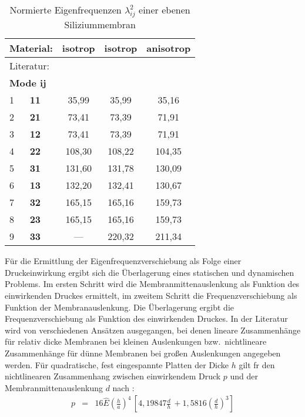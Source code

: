 \begin{table}[htb]
\caption{\label{tabcij}
 Normierte Eigenfrequenzen $\lambda_{ij}^{2}$ einer ebenen Siliziummembran}
\begin{center}
\begin{tabular}{|l||c|c|c|} \hline
 {\bf Material}: & {\bf isotrop} & {\bf isotrop} & {\bf anisotrop} \\
\hline
 Literatur:      & \cite{Ble84}  &  \cite{Pon91} & \cite{Pon91} \\ \hline
\hline
{\bf Mode ij}   &               &               & \\
 1 $ \quad $ {\bf 11} & 35,99  & 35,99 & 35,16 \\
 2 $ \quad $ {\bf 21} & 73,41  & 73,39 & 71,91 \\
 3 $ \quad $ {\bf 12} & 73,41  & 73,39 & 71,91 \\
 4 $ \quad $ {\bf 22} & 108,30  & 108,22 & 104,35 \\
 5 $ \quad $ {\bf 31} & 131,60  & 131,78 & 130,09 \\
 6 $ \quad $ {\bf 13} & 132,20  & 132,41 & 130,67 \\
 7 $ \quad $ {\bf 32} & 165,15  & 165,16 & 159,73 \\
 8 $ \quad $ {\bf 23} & 165,15  & 165,16 & 159,73 \\
 9 $ \quad $ {\bf 33} & ---     & 220,32 & 211,34 \\ \hline
\end{tabular}
\end{center}
\end{table}
Für die Ermittlung der Eigenfrequenzverschiebung als Folge einer
Druckeinwirkung ergibt sich die Überlagerung eines statischen
und dynamischen Problems. Im
ersten Schritt wird die Membranmittenauslenkung als Funktion des
einwirkenden Druckes ermittelt, im zweitem Schritt die
Frequenzverschiebung als Funktion der Membranauslenkung.  Die
Überlagerung ergibt die Frequenzverschiebung als Funktion des
einwirkenden Druckes. In der Literatur wird von verschiedenen Ansätzen
ausgegangen, bei denen lineare Zusammenhänge für relativ dicke Membranen
bei kleinen Auslenkungen bzw.\ nichtlineare Zusammenhänge für dünne
Membranen bei großen Auslenkungen angegeben werden.  Für quadratische,
fest eingespannte Platten der Dicke $h$ gilt fr den nichtlinearen
Zusammenhang zwischen einwirkendem Druck $p$ und der
Membranmittenauslenkung $ d $ nach \cite{Cha87}:
%
\begin{eqnarray}
\label{pvond}
 p & = & 16 \hat E \left( \frac{h}{a} \right)^{4} \, \left[ 4,19847
 \frac{d}{h} \, + 1,5816 \left( \frac{d}{h} \right)^{3} \right]
\end{eqnarray}
